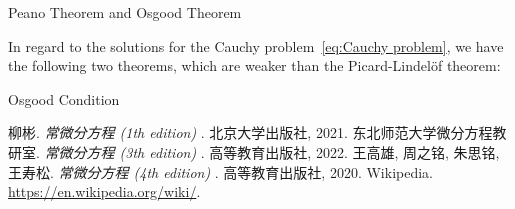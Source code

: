\documentclass[11pt]{../../TexTemplate/elegantbook}
\begin{document}
\begin{proposition}
    
\end{proposition}

\begin{leftbarTitle}{Peano Theorem and Osgood Theorem}\end{leftbarTitle}
In regard to the solutions for the Cauchy problem~\eqref{eq:Cauchy problem},
we have the following two theorems, which are weaker than the Picard-Lindelöf theorem:

\begin{definition}{Osgood Condition}
\end{definition}


\begin{thebibliography}{99} 
 柳彬. \emph{常微分方程 (1th edition) }. 北京大学出版社, 2021.
 东北师范大学微分方程教研室. \emph{常微分方程 (3th edition) }. 高等教育出版社, 2022.
 王高雄, 周之铭, 朱思铭, 王寿松. \emph{常微分方程 (4th edition) }. 高等教育出版社, 2020.
 Wikipedia. \url{https://en.wikipedia.org/wiki/}.

\end{thebibliography}
\end{document}
